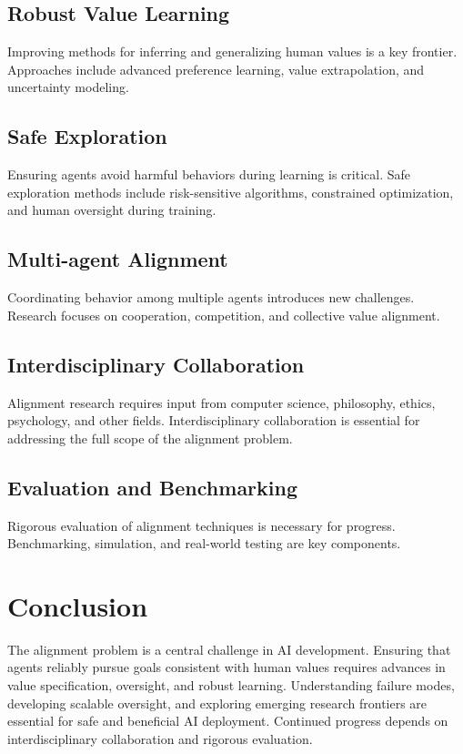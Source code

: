 \begin{TNtwocol}
\subsection{Robust Value Learning}
Improving methods for inferring and generalizing human values is a key frontier. Approaches include advanced preference learning, value extrapolation, and uncertainty modeling.

\subsection{Safe Exploration}
Ensuring agents avoid harmful behaviors during learning is critical. Safe exploration methods include risk-sensitive algorithms, constrained optimization, and human oversight during training.

\subsection{Multi-agent Alignment}
Coordinating behavior among multiple agents introduces new challenges. Research focuses on cooperation, competition, and collective value alignment.

\subsection{Interdisciplinary Collaboration}
Alignment research requires input from computer science, philosophy, ethics, psychology, and other fields. Interdisciplinary collaboration is essential for addressing the full scope of the alignment problem.

\subsection{Evaluation and Benchmarking}
Rigorous evaluation of alignment techniques is necessary for progress. Benchmarking, simulation, and real-world testing are key components.

\section{Conclusion}
The alignment problem is a central challenge in AI development. Ensuring that agents reliably pursue goals consistent with human values requires advances in value specification, oversight, and robust learning. Understanding failure modes, developing scalable oversight, and exploring emerging research frontiers are essential for safe and beneficial AI deployment. Continued progress depends on interdisciplinary collaboration and rigorous evaluation.

\end{TNtwocol}
